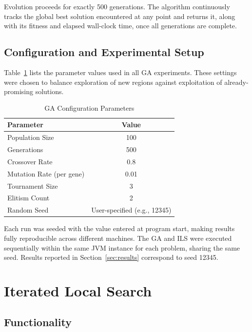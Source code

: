 \documentclass[12pt, a4paper]{article}
\begin{document}
Evolution proceeds for exactly 500 generations. The algorithm continuously tracks the global best solution encountered at any point and returns it, along with its fitness and elapsed wall-clock time, once all generations are complete.

\subsection{Configuration and Experimental Setup}

Table~\ref{tab:ga_config} lists the parameter values used in all GA experiments. These settings were chosen to balance exploration of new regions against exploitation of already-promising solutions.

\vspace{0.5em}
\begin{table}[ht]
    \centering
    \begin{tabular}{lc}
        \toprule
        \textbf{Parameter} & \textbf{Value} \\
        \midrule
        Population Size          & 100 \\
        Generations              & 500 \\
        Crossover Rate           & 0.8 \\
        Mutation Rate (per gene) & 0.01 \\
        Tournament Size          & 3 \\
        Elitism Count            & 2 \\
        Random Seed              & User-specified (e.g., 12345) \\
        \bottomrule
    \end{tabular}
    \caption{GA Configuration Parameters}
    \label{tab:ga_config}
\end{table}

Each run was seeded with the value entered at program start, making results fully reproducible across different machines. The GA and ILS were executed sequentially within the same JVM instance for each problem, sharing the same seed. Results reported in Section~\ref{sec:results} correspond to seed 12345.

\section{Iterated Local Search}

\subsection{Functionality}
\end{document}
